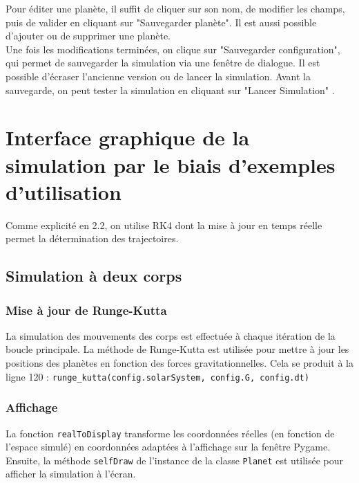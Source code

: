\documentclass[a4paper, 12pt]{article}
\begin{document}
	Pour éditer une planète, il suffit de cliquer sur son nom, de modifier les champs, puis de valider en cliquant sur "Sauvegarder planète". Il est aussi possible d'ajouter ou de supprimer une planète.\\
	
	Une fois les modifications terminées, on clique sur "Sauvegarder configuration", qui permet de sauvegarder la simulation via une fenêtre de dialogue. Il est possible d'écraser l'ancienne version ou de lancer la simulation. Avant la sauvegarde, on peut tester la simulation en cliquant sur "Lancer Simulation"
.


\section{Interface graphique de la simulation par le biais d'exemples d'utilisation} 
Comme explicité en 2.2, on utilise RK4 dont la mise à jour en temps réelle permet la détermination des trajectoires.

\subsection{Simulation à deux corps}
\subsubsection{Mise à jour de Runge-Kutta}
La simulation des mouvements des corps est effectuée à chaque itération de la boucle principale. La méthode de Runge-Kutta est utilisée pour mettre à jour les positions des planètes en fonction des forces gravitationnelles. Cela se produit à la ligne 120 : \texttt{runge\_kutta(config.solarSystem, config.G, config.dt)}

\subsubsection{Affichage}
La fonction \texttt{realToDisplay} transforme les coordonnées réelles (en fonction de l'espace simulé) en coordonnées adaptées à l'affichage sur la fenêtre Pygame. Ensuite, la méthode \texttt{selfDraw} de l'instance de
la classe \texttt{Planet} est utilisée pour afficher la simulation à l'écran.
\end{document}
